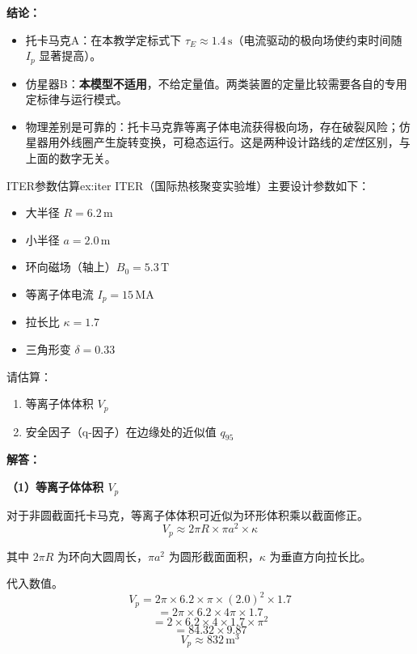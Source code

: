 \textbf{结论：}
\begin{itemize}
    \item 托卡马克A：在本教学定标式下 $\tau_E \approx 1.4\,\mathrm{s}$（电流驱动的极向场使约束时间随 $I_p$ 显著提高）。
    \item 仿星器B：\textbf{本模型不适用}，不给定量值。两类装置的定量比较需要各自的专用定标律与运行模式。
    \item 物理差别是可靠的：托卡马克靠等离子体电流获得极向场，存在破裂风险；仿星器用外线圈产生旋转变换，可稳态运行。这是两种设计路线的\emph{定性}区别，与上面的数字无关。
\end{itemize}


\begin{example}{ITER参数估算}{ex:iter}
ITER（国际热核聚变实验堆）主要设计参数如下：
\begin{itemize}
    \item 大半径 $R=6.2\,\mathrm{m}$
    \item 小半径 $a=2.0\,\mathrm{m}$
    \item 环向磁场（轴上）$B_0=5.3\,\mathrm{T}$
    \item 等离子体电流 $I_p=15\,\mathrm{MA}$
    \item 拉长比 $\kappa = 1.7$
    \item 三角形变 $\delta = 0.33$
\end{itemize}
请估算：
\begin{enumerate}
    \item 等离子体体积 $V_p$
    \item 安全因子（q-因子）在边缘处的近似值 $q_{95}$
\end{enumerate}
\end{example}

\textbf{解答：}

\textbf{（1）等离子体体积 $V_p$}

对于非圆截面托卡马克，等离子体体积可近似为环形体积乘以截面修正。
\begin{equation}
    V_p \approx 2\pi R \times \pi a^2 \times \kappa
\label{eq:ch10-tokamak-volume}
\end{equation}

其中 $2\pi R$ 为环向大圆周长，$\pi a^2$ 为圆形截面面积，$\kappa$ 为垂直方向拉长比。

代入数值。
\[
    V_p = 2\pi \times 6.2 \times \pi \times (2.0)^2 \times 1.7
\]
\[
    = 2\pi \times 6.2 \times 4\pi \times 1.7
\]
\[
    = 2 \times 6.2 \times 4 \times 1.7 \times \pi^2
\]
\[
    = 84.32 \times 9.87
\]
\[
    \boxed{V_p \approx 832\,\mathrm{m^3}}
\]

